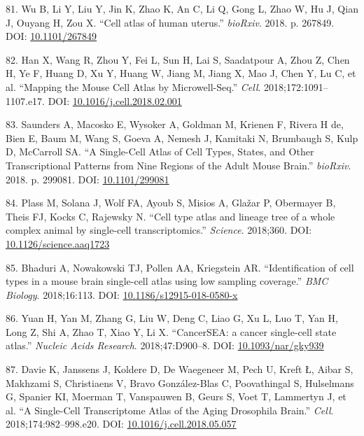 \documentclass[11pt,a4paper,titlepage,twoside,openright]{style/unimelbthesis}
\theoremstyle{definition}
\theoremstyle{definition}
\theoremstyle{definition}
\theoremstyle{remark}
\begin{document}
\begin{mainmatter}
\leavevmode\hypertarget{ref-Wu2018-xd}{}%
81. Wu B, Li Y, Liu Y, Jin K, Zhao K, An C, Li Q, Gong L, Zhao W, Hu J, Qian J, Ouyang H, Zou X. ``Cell atlas of human uterus.'' \emph{bioRxiv}. 2018. p. 267849. DOI: \href{https://doi.org/10.1101/267849}{10.1101/267849}

\leavevmode\hypertarget{ref-Han2018-kp}{}%
82. Han X, Wang R, Zhou Y, Fei L, Sun H, Lai S, Saadatpour A, Zhou Z, Chen H, Ye F, Huang D, Xu Y, Huang W, Jiang M, Jiang X, Mao J, Chen Y, Lu C, et al. ``Mapping the Mouse Cell Atlas by Microwell-Seq.'' \emph{Cell}. 2018;172:1091--1107.e17. DOI: \href{https://doi.org/10.1016/j.cell.2018.02.001}{10.1016/j.cell.2018.02.001}

\leavevmode\hypertarget{ref-Saunders2018-ut}{}%
83. Saunders A, Macosko E, Wysoker A, Goldman M, Krienen F, Rivera H de, Bien E, Baum M, Wang S, Goeva A, Nemesh J, Kamitaki N, Brumbaugh S, Kulp D, McCarroll SA. ``A Single-Cell Atlas of Cell Types, States, and Other Transcriptional Patterns from Nine Regions of the Adult Mouse Brain.'' \emph{bioRxiv}. 2018. p. 299081. DOI: \href{https://doi.org/10.1101/299081}{10.1101/299081}

\leavevmode\hypertarget{ref-Plass2018-sa}{}%
84. Plass M, Solana J, Wolf FA, Ayoub S, Misios A, Glažar P, Obermayer B, Theis FJ, Kocks C, Rajewsky N. ``Cell type atlas and lineage tree of a whole complex animal by single-cell transcriptomics.'' \emph{Science}. 2018;360. DOI: \href{https://doi.org/10.1126/science.aaq1723}{10.1126/science.aaq1723}

\leavevmode\hypertarget{ref-Bhaduri2018-nt}{}%
85. Bhaduri A, Nowakowski TJ, Pollen AA, Kriegstein AR. ``Identification of cell types in a mouse brain single-cell atlas using low sampling coverage.'' \emph{BMC Biology}. 2018;16:113. DOI: \href{https://doi.org/10.1186/s12915-018-0580-x}{10.1186/s12915-018-0580-x}

\leavevmode\hypertarget{ref-Yuan2018-qu}{}%
86. Yuan H, Yan M, Zhang G, Liu W, Deng C, Liao G, Xu L, Luo T, Yan H, Long Z, Shi A, Zhao T, Xiao Y, Li X. ``CancerSEA: a cancer single-cell state atlas.'' \emph{Nucleic Acids Research}. 2018;47:D900--8. DOI: \href{https://doi.org/10.1093/nar/gky939}{10.1093/nar/gky939}

\leavevmode\hypertarget{ref-Davie2018-eo}{}%
87. Davie K, Janssens J, Koldere D, De Waegeneer M, Pech U, Kreft Ł, Aibar S, Makhzami S, Christiaens V, Bravo González-Blas C, Poovathingal S, Hulselmans G, Spanier KI, Moerman T, Vanspauwen B, Geurs S, Voet T, Lammertyn J, et al. ``A Single-Cell Transcriptome Atlas of the Aging Drosophila Brain.'' \emph{Cell}. 2018;174:982--998.e20. DOI: \href{https://doi.org/10.1016/j.cell.2018.05.057}{10.1016/j.cell.2018.05.057}


\end{mainmatter}
\end{document}
